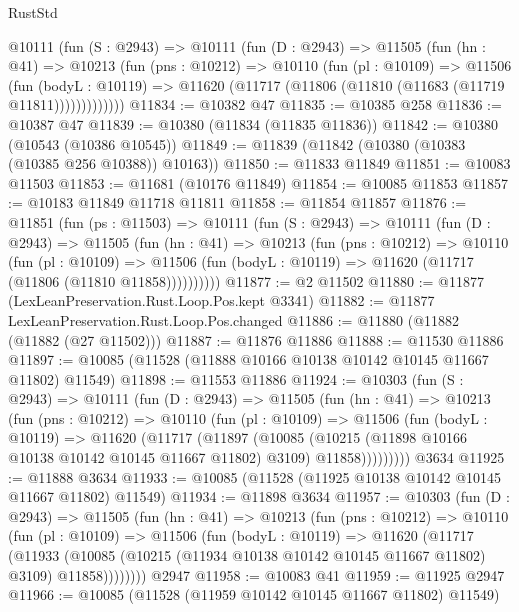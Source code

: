 \begin{lexlean}{RustStd}
\begin{coremodule}
      @10111
        (fun (S : @2943) =>
        @10111
          (fun (D : @2943) =>
          @11505
            (fun (hn : @41) =>
            @10213
              (fun (pns : @10212) =>
              @10110
                (fun (pl : @10109) =>
                @11506
                  (fun (bodyL : @10119) =>
                  @11620 (@11717 (@11806 (@11810 (@11683 (@11719 @11811)))))))))))))
@11834 := @10382 @47
@11835 := @10385 @258
@11836 := @10387 @47
@11839 := @10380 (@11834 (@11835 @11836))
@11842 := @10380 (@10543 (@10386 @10545))
@11849 := @11839 (@11842 (@10380 (@10383 (@10385 @256 @10388)) @10163))
@11850 := @11833 @11849
@11851 := @10083 @11503
@11853 := @11681 (@10176 @11849)
@11854 := @10085 @11853
@11857 := @10183 @11849 @11718 @11811
@11858 := @11854 @11857
@11876 := @11851
    (fun (ps : @11503) =>
    @10111
      (fun (S : @2943) =>
      @10111
        (fun (D : @2943) =>
        @11505
          (fun (hn : @41) =>
          @10213
            (fun (pns : @10212) =>
            @10110
              (fun (pl : @10109) =>
              @11506 (fun (bodyL : @10119) => @11620 (@11717 (@11806 (@11810 @11858))))))))))
@11877 := @2 @11502
@11880 := @11877 (LexLeanPreservation.Rust.Loop.Pos.kept @3341)
@11882 := @11877 LexLeanPreservation.Rust.Loop.Pos.changed
@11886 := @11880 (@11882 (@11882 (@27 @11502)))
@11887 := @11876 @11886
@11888 := @11530 @11886
@11897 := @10085 (@11528 (@11888 @10166 @10138 @10142 @10145 @11667 @11802) @11549)
@11898 := @11553 @11886
@11924 := @10303
    (fun (S : @2943) =>
    @10111
      (fun (D : @2943) =>
      @11505
        (fun (hn : @41) =>
        @10213
          (fun (pns : @10212) =>
          @10110
            (fun (pl : @10109) =>
            @11506
              (fun (bodyL : @10119) =>
              @11620
                (@11717
                  (@11897
                    (@10085
                      (@10215 (@11898 @10166 @10138 @10142 @10145 @11667 @11802) @3109)
                      @11858)))))))))
    @3634
@11925 := @11888 @3634
@11933 := @10085 (@11528 (@11925 @10138 @10142 @10145 @11667 @11802) @11549)
@11934 := @11898 @3634
@11957 := @10303
    (fun (D : @2943) =>
    @11505
      (fun (hn : @41) =>
      @10213
        (fun (pns : @10212) =>
        @10110
          (fun (pl : @10109) =>
          @11506
            (fun (bodyL : @10119) =>
            @11620
              (@11717
                (@11933
                  (@10085 (@10215 (@11934 @10138 @10142 @10145 @11667 @11802) @3109) @11858))))))))
    @2947
@11958 := @10083 @41
@11959 := @11925 @2947
@11966 := @10085 (@11528 (@11959 @10142 @10145 @11667 @11802) @11549)

\end{coremodule}
\end{lexlean}
